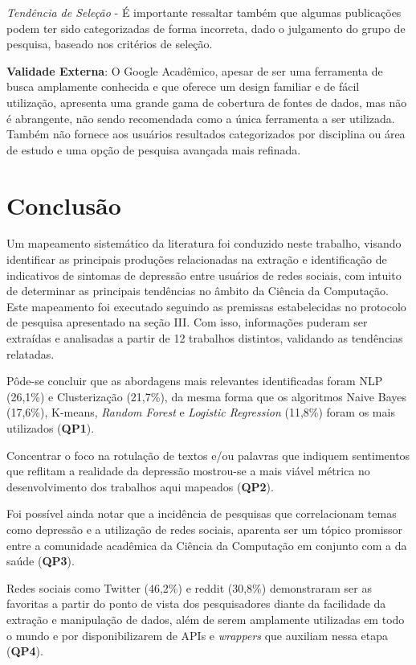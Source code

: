\documentclass[conference]{IEEEtran}
\begin{document}
\textit{Tendência de Seleção} - É importante ressaltar também que algumas publicações podem ter sido categorizadas de forma incorreta, dado o julgamento do grupo de pesquisa, baseado nos critérios de seleção.

\textbf{Validade Externa}: O Google Acadêmico, apesar de ser uma ferramenta de busca amplamente conhecida e que oferece um design familiar e de fácil utilização, apresenta uma grande gama de cobertura de fontes de dados, mas não é abrangente, não sendo recomendada como a única ferramenta a ser utilizada. Também não fornece aos usuários resultados categorizados por disciplina ou área de estudo e uma opção de pesquisa avançada mais refinada.

\section{Conclusão}
Um mapeamento sistemático da literatura foi conduzido neste trabalho, visando identificar as principais produções relacionadas na extração e identificação de indicativos de sintomas de depressão entre usuários de redes sociais, com intuito de determinar as principais tendências no âmbito da Ciência da Computação. Este mapeamento foi executado seguindo as premissas estabelecidas no protocolo de pesquisa apresentado na seção III. Com isso, informações puderam ser extraídas e analisadas a partir de 12 trabalhos distintos, validando as tendências relatadas.

Pôde-se concluir que as abordagens mais relevantes identificadas foram NLP (26,1\%) e Clusterização (21,7\%), da mesma forma que os algoritmos Naive Bayes (17,6\%), K-means, \textit{Random Forest} e \textit{Logistic Regression} (11,8\%) foram os mais utilizados (\textbf{QP1}).

Concentrar o foco na rotulação de textos e/ou palavras que indiquem sentimentos que reflitam a realidade da depressão mostrou-se a mais viável métrica no desenvolvimento dos trabalhos aqui mapeados (\textbf{QP2}).

Foi possível ainda notar que a incidência de pesquisas que correlacionam temas como depressão e a utilização de redes sociais, aparenta ser um tópico promissor entre a comunidade acadêmica da Ciência da Computação em conjunto com a da saúde (\textbf{QP3}).

Redes sociais como Twitter (46,2\%) e reddit (30,8\%) demonstraram ser as favoritas a partir do ponto de vista dos pesquisadores diante da facilidade da extração e manipulação de dados, além de serem amplamente utilizadas em todo o mundo e por disponibilizarem de APIs e \textit{wrappers} que auxiliam nessa etapa (\textbf{QP4}).
\end{document}
